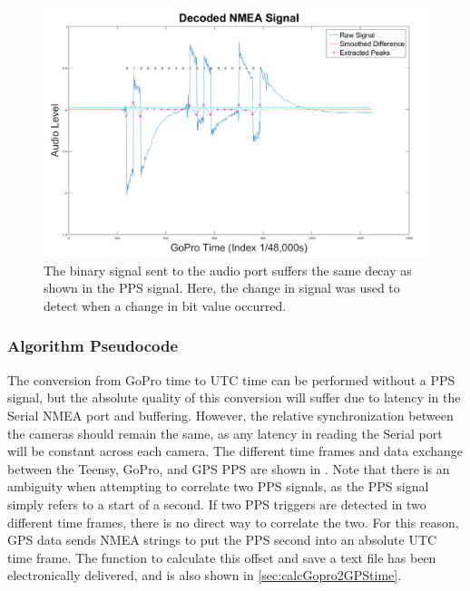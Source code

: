 	\begin{figure}[H]
		\centering
		\includegraphics[scale = 0.4]{../figures/decodedNMEA.png}
		\caption{The binary signal sent to the audio port suffers the same decay as shown in the PPS signal.  Here, the change in signal was used to detect when a change in bit value occurred.}
		\label{fig:rawNMEA}
	\end{figure}
	
	\subsubsection{Algorithm Pseudocode}
		The conversion from GoPro time to UTC time can be performed without a PPS signal, but the absolute quality of this conversion will suffer due to latency in the Serial NMEA port and buffering.  However, the relative synchronization between the cameras should remain the same, as any latency in reading the Serial port will be constant across each camera.  The different time frames and data exchange between the Teensy, GoPro, and GPS PPS are shown in .  Note that there is an ambiguity when attempting to correlate two PPS signals, as the PPS signal simply refers to a start of a second.  If two PPS triggers are detected in two different time frames, there is no direct way to correlate the two.  For this reason, GPS data sends NMEA strings to put the PPS second into an absolute UTC time frame.  The function to calculate this offset and save a text file has been electronically delivered, and is also shown in \ref{sec:calcGopro2GPStime}.  
	
